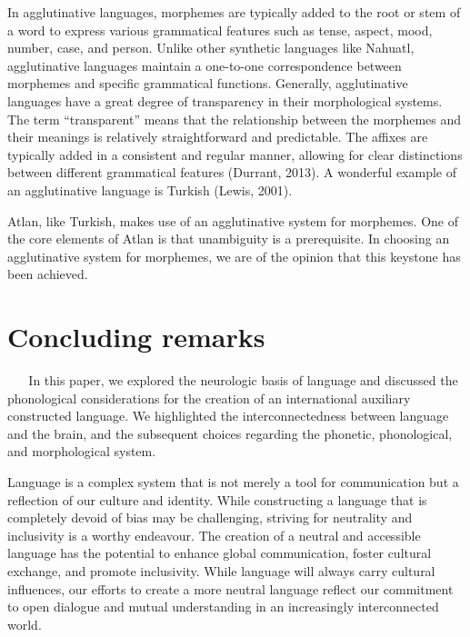 In agglutinative languages, morphemes are typically added to the root or stem of a word to express various grammatical features such as tense, aspect, mood, number, case, and person. Unlike other synthetic languages like Nahuatl, agglutinative languages maintain a one-to-one correspondence between morphemes and specific grammatical functions. Generally, agglutinative languages have a great degree of transparency in their morphological systems. The term “transparent” means that the relationship between the morphemes and their meanings is relatively straightforward and predictable. The affixes are typically added in a consistent and regular manner, allowing for clear distinctions between different grammatical features (Durrant, 2013). A wonderful example of an agglutinative language is Turkish (Lewis, 2001). 

Atlan, like Turkish, makes use of an agglutinative system for morphemes. One of the core elements of Atlan is that unambiguity is a prerequisite. In choosing an agglutinative system for morphemes, we are of the opinion that this keystone has been achieved.  
  
  
\section{Concluding remarks} 
  
\noindent In this paper, we explored the neurologic basis of language and discussed the phonological considerations for the creation of an international auxiliary constructed language. We highlighted the interconnectedness between language and the brain, and the subsequent choices regarding the phonetic, phonological, and morphological system.

Language is a complex system that is not merely a tool for communication but a reflection of our culture and identity. While constructing a language that is completely devoid of bias may be challenging, striving for neutrality and inclusivity is a worthy endeavour. The creation of a neutral and accessible language has the potential to enhance global communication, foster cultural exchange, and promote inclusivity. While language will always carry cultural influences, our efforts to create a more neutral language reflect our commitment to open dialogue and mutual understanding in an increasingly interconnected world. 

\vfill
